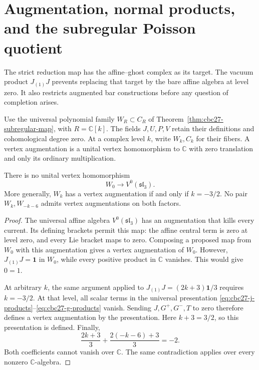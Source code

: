 \section{Augmentation, normal products, and the subregular Poisson quotient}
\label{sec:cbc28-subregular-bar}

The strict reduction map has the affine--ghost complex as its target.
The vacuum product $J_{(1)}J$ prevents replacing that target by the bare affine algebra at level zero.
It also restricts augmented bar constructions before any question of completion arises.

Use the universal polynomial family $W_R\subset C_R$ of
Theorem~\ref{thm:cbc27-subregular-map}, with $R=\mathbb C[k]$.
The fields $J,U,P,V$ retain their definitions and cohomological degree zero.
At a complex level $k$, write $W_k,C_k$ for their fibers.
A vertex augmentation is a unital vertex homomorphism to $\mathbb C$ with zero translation and only its ordinary multiplication.

\begin{proposition}\label{prop:cbc28-nonembedding}
There is no unital vertex homomorphism
\[
 W_0\longrightarrow V^0(\mathfrak{sl}_3).
\]
More generally, $W_k$ has a vertex augmentation if and only if $k=-3/2$.
No pair $W_k,W_{-k-6}$ admits vertex augmentations on both factors.
\end{proposition}
\begin{proof}
The universal affine algebra $V^0(\mathfrak{sl}_3)$ has an augmentation that kills every current.
Its defining brackets permit this map: the affine central term is zero at level zero, and every Lie bracket maps to zero.
Composing a proposed map from $W_0$ with this augmentation gives a vertex augmentation of $W_0$.
However, $J_{(1)}J=\mathbf1$ in $W_0$, while every positive product in $\mathbb C$ vanishes.
This would give $0=1$.

At arbitrary $k$, the same argument applied to
$J_{(1)}J=(2k+3)\mathbf1/3$ requires $k=-3/2$.
At that level, all scalar terms in the universal presentation
\eqref{eq:cbc27-j-products}--\eqref{eq:cbc27-g-products} vanish.
Sending $J,G^+,G^-,T$ to zero therefore defines a vertex augmentation by the presentation.
Here $k+3=3/2$, so this presentation is defined.
Finally,
\[
 \frac{2k+3}{3}+\frac{2(-k-6)+3}{3}=-2.
\]
Both coefficients cannot vanish over $\mathbb C$.
The same contradiction applies over every nonzero $\mathbb C$-algebra.
\end{proof}

